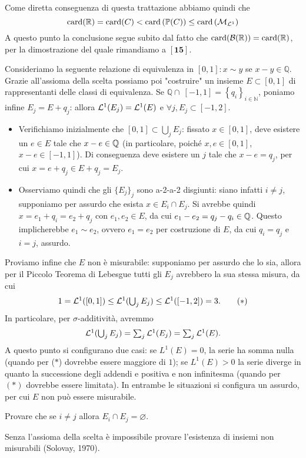 \begin{remark}
  Come diretta conseguenza di questa trattazione abbiamo quindi che 
  \[
  \operatorname{card}(\mathbb{R})=\operatorname{card}(C)<\operatorname{card}\left(\mathbb{P}({C})\right) \leq \operatorname{card}\left(\mathcal{M}_{\mathcal{L}^{1}}\right)
  \]
  A questo punto la conclusione segue subito dal fatto che $\operatorname{card}(\mathcal{B}(\mathbb{R}))=\operatorname{card}(\mathbb{R})$, per la dimostrazione del quale rimandiamo a $[\mathbf{1 5}]$.
\end{remark}
\begin{example} Consideriamo la seguente relazione di equivalenza in $[0,1]: x \sim y$ se $x-y \in \mathbb{Q}$. Grazie all'assioma della scelta possiamo poi "costruire" un insieme $E\subset [0,1]$ di rappresentanti delle classi di equivalenza. Se $\mathbb{Q} \cap\ [-1,1]=\left\{q_{i}\right\}_{i \in \mathbb{N}}$, poniamo infine $E_j = E + q_j$: allora $\mathcal{L}^1(E_j) = \mathcal{L}^1(E)$ e $\forall j, E_j\subset [-1,2]$. 
\begin{itemize}
  \item Verifichiamo inizialmente che $[0,1]\subset \bigcup_jE_j$: fissato $x\in [0,1]$, deve esistere un $e\in E$ tale che $x-e\in \mathbb{Q}$ (in particolare, poiché $x,e\in [0,1]$, $x-e\in [-1,1]$). Di conseguenza deve esistere un $j$ tale che $x-e = q_j$, per cui $x = e+q_j\in E+q_j = E_j$.
  \item Osserviamo quindi che gli $\{E_j\}_j$ sono a-2-a-2 disgiunti: siano infatti $i\neq j$, supponiamo per assurdo che esista $x\in E_i\cap E_j$. Si avrebbe quindi $x = e_1+q_i = e_2+q_j$ con $e_1,e_2\in E$, da cui $e_1-e_2 = q_j-q_i\in \mathbb{Q}$. Questo implicherebbe $e_1\sim e_2$, ovvero $e_1 = e_2$ per costruzione di $E$, da cui $q_i = q_j$ e $i = j$, assurdo.
\end{itemize}
Proviamo infine che $E$ non è misurabile: supponiamo per assurdo che lo sia, allora per il Piccolo Teorema di Lebesgue tutti gli $E_j$ avrebbero la sua stessa misura, da cui 
\[\textstyle 1 = \mathcal{L}^1([0,1]) \leq \mathcal{L}^1( \bigcup_jE_j)\leq \mathcal{L}^1([-1,2]) = 3.\tag{$*$}\]
In particolare, per $\sigma$-additività, avremmo 
\[\textstyle \mathcal{L}^1( \bigcup_jE_j) = \sum_j\mathcal{L}^1(E_j) = \sum_j\mathcal{L}^1(E).\]
A questo punto si configurano due casi: se $L^1(E) = 0$, la serie ha somma nulla (quando per ($*$) dovrebbe essere maggiore di $1$); se $L^1(E)>0$ la serie diverge in quanto la successione degli addendi e positiva e non infinitesma (quando per $(*)$ dovrebbe essere limitata). In entrambe le situazioni si configura un assurdo, per cui $E$ non può essere misurabile.
\end{example}
\begin{exc}Provare che se $i \neq j$ allora $E_{i} \cap E_{j}=\varnothing$.
\end{exc}
\begin{remark}Senza l'assioma della scelta è impossibile provare l'esistenza di insiemi non misurabili (Solovay, 1970).\end{remark}

